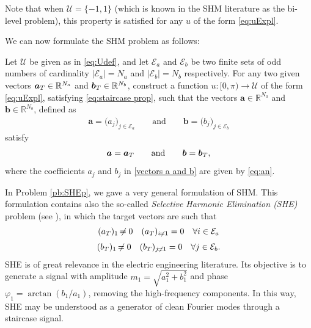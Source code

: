 \documentclass[twocolumn]{autart}    %
\begin{document}
Note that when $\mathcal{U} = \{-1,1\}$ (which is known in the SHM literature as the bi-level problem), this property is satisfied for any $u$ of the form \eqref{eq:uExpl}.

We can now formulate the SHM problem as follows:

\bigskip

\begin{problem}[SHM]\label{pb:SHEp}
Let $\mathcal{U}$ be given as in \eqref{eq:Udef}, and let $\mathcal{E} _a $ and $\mathcal{E} _b $ be two finite sets of odd numbers of cardinality $|\mathcal{E}_a| = N_a $ and $ |\mathcal{E} _b| = N_b$ respectively. For any two given vectors $\aT \in \mathbb{R}^{N_a}$ and $\bT \in \mathbb{R}^{N_b} $, construct a function $u: [0,\pi)\to\mathcal{U}$ of the form \eqref{eq:uExpl}, satisfying \eqref{eq:staircase prop}, such that the vectors $\bm{a} \in \mathbb{R}^{N_a}$ and $\bm{b} \in \mathbb{R}^{N_b}$, defined as
\begin{align}\label{vectors a and b}
	\bm{a} = \big( a_j \big)_{j\in \mathcal{E}_a} \qquad \text{and} \qquad
	\bm{b} = \big( b_j \big)_{j\in \mathcal{E}_b}
\end{align}
satisfy
\begin{align*} 
	\bm{a} = \aT \qquad \text{and} \qquad \bm{b} = \bT,
\end{align*}
where the coefficients $a_j$ and $b_j$ in \eqref{vectors a and b} are given by \eqref{eq:an}.
\end{problem}  
\vspace{1em}

\begin{remark}[SHE]\label{remark:SHE}
In Problem \ref{pb:SHEp}, we gave a very general formulation of SHM. This formulation contains also the so-called \emph{Selective Harmonic Elimination (SHE)} problem (see \cite{Sun1996}), in which the target vectors are such that 
\begin{gather}
	\notag (a_T)_1 \neq 0  \hspace{1em} (a_T)_{i\neq1} = 0 \hspace{1em} \forall i \in \mathcal{E}_a 
	\\[3pt]
	\notag (b_T)_1 \neq 0  \hspace{1em} (b_T)_{j\neq1} = 0 \hspace{1em} \forall j \in \mathcal{E}_b. 
\end{gather}
SHE is of great relevance in the electric engineering literature. Its objective is to generate a signal with amplitude $m_1 = \sqrt{a_1^2+b_1^2}$ and phase $\varphi_1=\arctan(b_1/a_1)$, removing the high-frequency components. In this way, SHE may be understood as a generator of clean Fourier modes through a staircase signal.
\end{remark}
\end{document}
